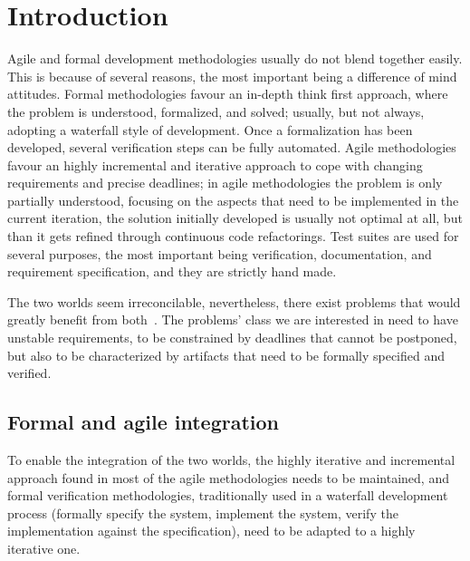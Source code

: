 \documentclass[english]{lni}
\begin{document}
\section{Introduction}
\label{sec:introduction}

Agile and formal development methodologies usually do not blend together easily.
This is because of several reasons, the most important being a difference of mind attitudes.
Formal methodologies favour an in-depth think first approach, where the problem is understood, formalized, and solved; usually, but not always, adopting a waterfall style of development.
Once a formalization has been developed, several verification steps can be fully automated.
Agile methodologies favour an highly incremental and iterative approach to cope with changing requirements and precise deadlines; in agile methodologies the problem is only partially understood, focusing on the aspects that need to be implemented in the current iteration, the solution initially developed is usually not optimal at all, but than it gets refined through continuous code refactorings.
Test suites are used for several purposes, the most important being verification, documentation, and requirement specification, and they are strictly hand made.

The two worlds seem irreconcilable, nevertheless, there exist problems that would greatly benefit from both~\cite{Black2009}.
The problems' class we are interested in need to have unstable requirements, to be constrained by deadlines that cannot be postponed, but also to be characterized by artifacts that need to be formally specified and verified.



\subsection{Formal and agile integration}
\label{subsec:formal_and_agile_integration}

To enable the integration of the two worlds, the highly iterative and incremental approach found in most of the agile methodologies needs to be maintained, and formal verification  methodologies, traditionally used in a waterfall development process (formally specify the system, implement the system, verify the implementation against the specification), need to be adapted to a highly iterative one.
\end{document}
